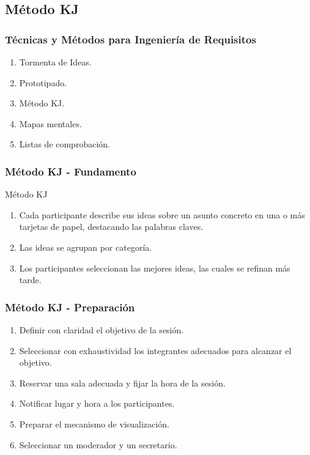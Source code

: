 ﻿\documentclass[handout,a4paper,slidestop,xcolor=pst,dvips,blue]{beamer}
\begin{document}
\subsection{Método KJ}

\begin{frame}[c]
    \frametitle{Técnicas y Métodos para Ingeniería de Requisitos}
    \begin{enumerate}
         \item Tormenta de Ideas.
         \item Prototipado.
         \item \alert{Método KJ}.
         \item Mapas mentales.
         \item Listas de comprobación.
    \end{enumerate}
\end{frame}

\begin{frame}[t]
    \frametitle{Método KJ - Fundamento}
    \begin{block}{Método KJ}
        \begin{enumerate}
            \item Cada participante describe sus ideas sobre un asunto concreto en una o más tarjetas de papel, destacando las palabras claves.
            \item Las ideas se agrupan por categoría.
            \item Los participantes seleccionan las mejores ideas, las cuales se refinan más tarde.
        \end{enumerate}
    \end{block}
\end{frame}

\begin{frame}[c]
    \frametitle{Método KJ - Preparación}
    \begin{enumerate}[<+->]
        \item Definir con claridad el \alert{objetivo} de la sesión.
        \item Seleccionar con exhaustividad los integrantes adecuados para alcanzar el objetivo.
        \item Reservar una sala adecuada y fijar la hora de la sesión.
        \item Notificar lugar y hora a los participantes.
        \item Preparar el mecanismo de visualización.
        \item Seleccionar un moderador y un secretario.
    \end{enumerate}
\end{frame}
\end{document}
